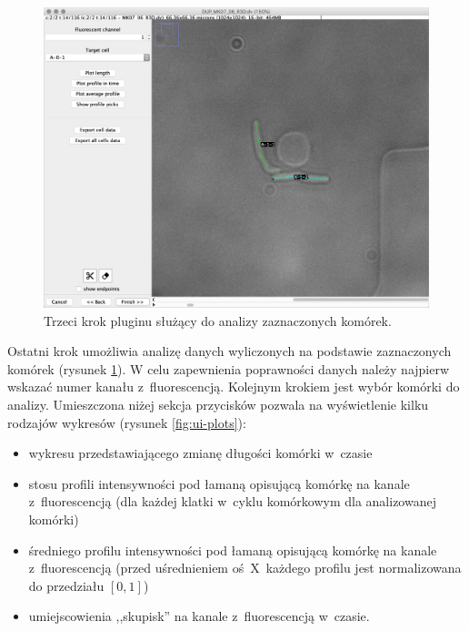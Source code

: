 \documentclass[declaration,shortabstract,mgr]{iithesis}
\begin{document}
\begin{figure}
  \centering
  \includegraphics[width=\textwidth]{images/ui-step-measurements.png}
  \caption{Trzeci krok pluginu służący do analizy zaznaczonych komórek.}
  \label{fig:ui-step-measurements}
\end{figure}

Ostatni krok umożliwia analizę danych wyliczonych na podstawie zaznaczonych komórek (rysunek \ref{fig:ui-step-measurements}).
W celu zapewnienia poprawności danych należy najpierw wskazać numer kanału z~fluorescencją. Kolejnym krokiem jest wybór komórki do analizy.
Umieszczona niżej sekcja przycisków pozwala na wyświetlenie kilku rodzajów wykresów (rysunek \ref{fig:ui-plots}):

\begin{itemize}
  \item wykresu przedstawiającego zmianę długości komórki w~czasie
  \item stosu profili intensywności pod łamaną opisującą komórkę na kanale z~fluorescencją (dla każdej klatki w~cyklu komórkowym dla analizowanej komórki)
  \item średniego profilu intensywności pod łamaną opisującą komórkę na kanale z~fluorescencją (przed uśrednieniem oś~X~każdego profilu jest normalizowana do przedziału $[0, 1]$)
  \item umiejscowienia ,,skupisk'' na kanale z~fluorescencją w~czasie.
\end{itemize}
\end{document}
